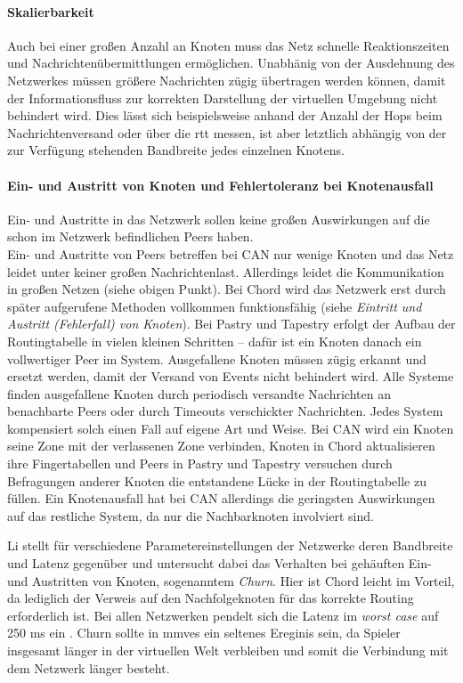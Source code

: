 \paragraph{Skalierbarkeit} Auch bei einer großen Anzahl an Knoten muss das Netz schnelle Reaktionszeiten und Nachrichtenübermittlungen ermöglichen. Unabhänig von der Ausdehnung des Netzwerkes müssen größere Nachrichten zügig übertragen werden können, damit der Informationsfluss zur korrekten Darstellung der virtuellen Umgebung nicht behindert wird. Dies lässt sich beispielsweise anhand der Anzahl der Hops beim Nachrichtenversand oder über die \ac{rtt} messen, ist aber letztlich abhängig von der zur Verfügung stehenden Bandbreite jedes einzelnen Knotens.

\paragraph{Ein- und Austritt von Knoten und Fehlertoleranz bei Knotenausfall} Ein- und Austritte in das Netzwerk sollen keine großen Auswirkungen auf die schon im Netzwerk befindlichen Peers haben.\\
Ein- und Austritte von Peers betreffen bei CAN nur wenige Knoten und das Netz leidet unter keiner großen Nachrichtenlast. Allerdings leidet die Kommunikation in großen Netzen (siehe obigen Punkt). Bei Chord wird das Netzwerk erst durch später aufgerufene Methoden vollkommen funktionsfähig (siehe \emph{Eintritt und Austritt (Fehlerfall) von Knoten}). Bei Pastry und Tapestry erfolgt der Aufbau der Routingtabelle in vielen kleinen Schritten -- dafür ist ein Knoten danach ein vollwertiger Peer im System. Ausgefallene Knoten müssen zügig erkannt und ersetzt werden, damit der Versand von Events nicht behindert wird. Alle Systeme finden ausgefallene Knoten durch periodisch versandte Nachrichten an benachbarte Peers oder durch Timeouts verschickter Nachrichten. Jedes System kompensiert solch einen Fall auf eigene Art und Weise. Bei CAN wird ein Knoten seine Zone mit der verlassenen Zone verbinden, Knoten in Chord aktualisieren ihre Fingertabellen und Peers in Pastry und Tapestry versuchen durch Befragungen anderer Knoten die entstandene Lücke in der Routingtabelle zu füllen. Ein Knotenausfall hat bei CAN allerdings die geringsten Auswirkungen auf das restliche System, da nur die Nachbarknoten involviert sind.

Li stellt für verschiedene Parametereinstellungen der Netzwerke deren Bandbreite und Latenz gegenüber und untersucht dabei das Verhalten bei gehäuften Ein- und Austritten von Knoten, sogenanntem \emph{Churn}. Hier ist Chord leicht im Vorteil, da lediglich der Verweis auf den Nachfolgeknoten für das korrekte Routing erforderlich ist. Bei allen Netzwerken pendelt sich die Latenz im \emph{worst case} auf 250 ms ein \cite{Li2004Comparing}. Churn sollte in \acp{mmve} ein seltenes Ereginis sein, da Spieler insgesamt länger in der virtuellen Welt verbleiben und somit die Verbindung mit dem Netzwerk länger besteht.

